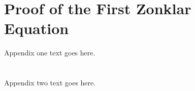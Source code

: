 
%
\appendices
\section{Proof of the First Zonklar Equation}
Appendix one text goes here.

\section{}
Appendix two text goes here.

